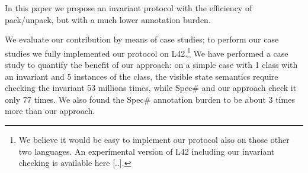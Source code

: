 


In this paper we propose an invariant protocol with the efficiency of pack/unpack, but with a much lower annotation burden.

We evaluate our contribution by means of case studies;
to perform our case studies we fully implemented our protocol on L42.\footnote{
We believe it would be easy to implement our protocol also on those other two languages.
An experimental version of L42 including our invariant checking is available here [..].}
We have performed a case study to quantify the benefit of our approach:
on a simple case with 1 class with an invariant and 5 instances of the class, the visible state semantics require checking the invariant 53 millions times, while Spec\# and our approach check it only 77 times. We also found the Spec\# annotation burden to be about 3 times more than our approach.

